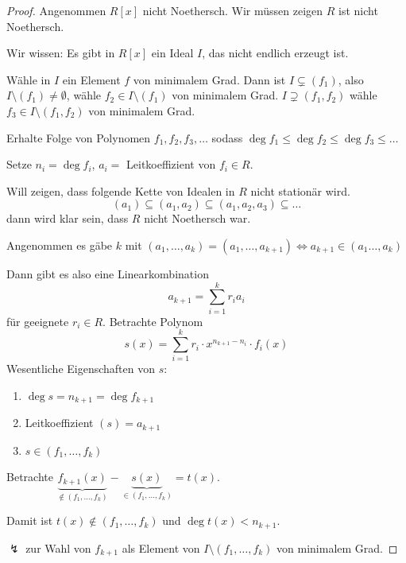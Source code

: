 \documentclass[a4paper,12pt,numbers=noenddot,parskip=full]{scrartcl}
\theoremstyle{dotless}
\theoremstyle{remark}
\begin{document}
	\begin{proof}
		Angenommen $R[x]$ nicht Noethersch. Wir müssen zeigen $R$ ist nicht Noethersch.
		
		Wir wissen: Es gibt in $R[x]$ ein Ideal $I$, das nicht endlich erzeugt ist.
		
		Wähle in $I$ ein Element $f$ von minimalem Grad. Dann ist $I \subsetneq (f_1)$, also $I \setminus (f_1) \neq \emptyset$, wähle $f_2 \in I \setminus (f_1)$ von minimalem Grad. $I \supsetneq (f_1, f_2)$ wähle $f_3 \in I \setminus (f_1, f_2)$ von minimalem Grad.
		
		Erhalte Folge von Polynomen $f_1, f_2, f_3, \dots$ sodass $\deg f_1 \leq \deg f_2 \leq \deg f_3 \leq \dots$
		
		Setze $n_i = \deg f_i$, $a_i = $ Leitkoeffizient von $f_i \in R$.
		
		Will zeigen, dass folgende Kette von Idealen in $R$ nicht stationär wird.
		\begin{equation*}
			(a_1) \subseteq (a_1, a_2) \subseteq (a_1, a_2, a_3) \subseteq \dots
		\end{equation*}
		dann wird klar sein, dass $R$ nicht Noethersch war.
		
		Angenommen es gäbe $k$ mit $(a_1, \dots, a_k) = (a_1, \dots, a_{k+1}) \Leftrightarrow a_{k+1} \in (a_1 \dots, a_k)$
		
		Dann gibt es also eine Linearkombination
		\begin{equation*}
			a_{k+1} = \sum_{i = 1}^k r_i a_i
		\end{equation*}
		für geeignete $r_i \in R$. Betrachte Polynom
		\begin{equation*}
			s(x) = \sum_{i = 1}^k r_i \cdot x^{n_{k+1} - n_i} \cdot f_i(x)
		\end{equation*}
		Wesentliche Eigenschaften von $s$:
		\begin{enumerate}
			\item $\deg s = n_{k+1} = \deg f_{k+1}$
			\item Leitkoeffizient $(s) = a_{k+1}$
			\item $s \in (f_1, \dots, f_k)$
		\end{enumerate}
	
		Betrachte $\underbrace{f_{k+1}(x)}_{\notin (f_1, \dots, f_k)} - \underbrace{s(x)}_{\in (f_1, \dots, f_k)} = t(x)$.
		
		Damit ist $t(x) \notin (f_1, \dots, f_k)$ und $\deg t(x) < n_{k+1}$.
		
		$\lightning$ zur Wahl von $f_{k+1}$ als Element von $I \setminus (f_1, \dots, f_k)$ von minimalem Grad.
	\end{proof}
\end{document}
